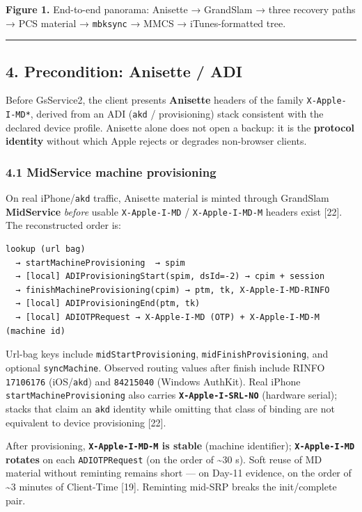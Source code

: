 \documentclass[
  english,
  10pt]{article}
\begin{document}
\textbf{Figure 1.} End-to-end panorama: Anisette → GrandSlam → three
recovery paths → PCS material → \texttt{mbksync} → MMCS →
iTunes-formatted tree.

\begin{center}\rule{0.5\linewidth}{0.5pt}\end{center}

\subsection{4. Precondition: Anisette /
ADI}\label{precondition-anisette-adi}

Before GsService2, the client presents \textbf{Anisette} headers of the
family \texttt{X-Apple-I-MD*}, derived from an ADI (\texttt{akd} /
provisioning) stack consistent with the declared device profile.
Anisette alone does not open a backup: it is the \textbf{protocol
identity} without which Apple rejects or degrades non-browser clients.

\subsubsection{4.1 MidService machine
provisioning}\label{midservice-machine-provisioning}

On real iPhone/\texttt{akd} traffic, Anisette material is minted through
GrandSlam \textbf{MidService} \emph{before} usable \texttt{X-Apple-I-MD}
/ \texttt{X-Apple-I-MD-M} headers exist {[}22{]}. The reconstructed
order is:

\begin{verbatim}
lookup (url bag)
  → startMachineProvisioning  → spim
  → [local] ADIProvisioningStart(spim, dsId=-2) → cpim + session
  → finishMachineProvisioning(cpim) → ptm, tk, X-Apple-I-MD-RINFO
  → [local] ADIProvisioningEnd(ptm, tk)
  → [local] ADIOTPRequest → X-Apple-I-MD (OTP) + X-Apple-I-MD-M (machine id)
\end{verbatim}

Url-bag keys include \texttt{midStartProvisioning},
\texttt{midFinishProvisioning}, and optional \texttt{syncMachine}.
Observed routing values after finish include RINFO \texttt{17106176}
(iOS/\texttt{akd}) and \texttt{84215040} (Windows AuthKit). Real iPhone
\texttt{startMachineProvisioning} also carries
\textbf{\texttt{X-Apple-I-SRL-NO}} (hardware serial); stacks that claim
an \texttt{akd} identity while omitting that class of binding are not
equivalent to device provisioning {[}22{]}.

After provisioning, \textbf{\texttt{X-Apple-I-MD-M} is stable} (machine
identifier); \textbf{\texttt{X-Apple-I-MD} rotates} on each
\texttt{ADIOTPRequest} (on the order of \textasciitilde30 s). Soft reuse
of MD material without reminting remains short --- on Day-11 evidence,
on the order of \textasciitilde3 minutes of Client-Time {[}19{]}.
Reminting mid-SRP breaks the init/complete pair.
\end{document}

